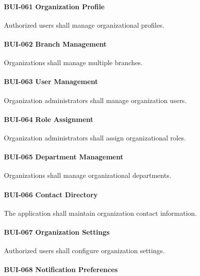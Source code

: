 \paragraph{BUI-061 Organization Profile}

Authorized users shall manage organizational profiles.

\paragraph{BUI-062 Branch Management}

Organizations shall manage multiple branches.

\paragraph{BUI-063 User Management}

Organization administrators shall manage organization users.

\paragraph{BUI-064 Role Assignment}

Organization administrators shall assign organizational roles.

\paragraph{BUI-065 Department Management}

Organizations shall manage organizational departments.

\paragraph{BUI-066 Contact Directory}

The application shall maintain organization contact information.

\paragraph{BUI-067 Organization Settings}

Authorized users shall configure organization settings.

\paragraph{BUI-068 Notification Preferences}

